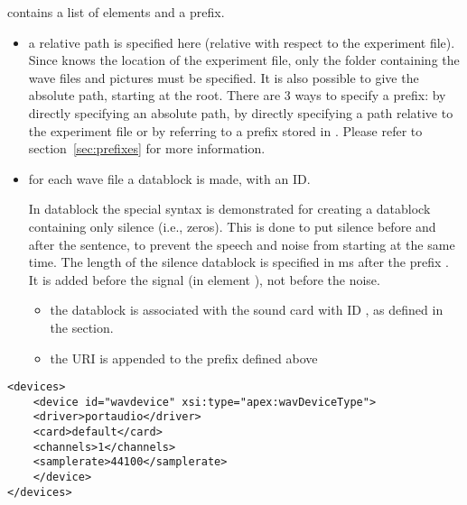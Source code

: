  contains a list of 
elements and a prefix.
\begin{itemize}
\item {} a relative path is specified here
(relative with respect to the experiment file). Since \apex knows
the location of the experiment file, only the folder containing
the wave files and pictures must be specified. It is also possible
to give the absolute path, starting at the root. There are 3 ways
to specify a prefix: by directly specifying an absolute path, by
directly specifying a path relative to the experiment file or by
referring to a prefix stored in . Please
refer to section~\ref{sec:prefixes} for more information. 

\item {} for each wave file a datablock is made,
with an ID.

In datablock  the special syntax is
demonstrated for creating a datablock containing only silence
(i.e., zeros). This is done to put silence before and after the
sentence, to prevent the speech and noise from
starting at the same time. The length of the silence datablock is
specified in ms after the prefix . It is added before the signal (in element ), not
before the noise.

\begin{itemize}
\item the datablock is associated with the sound card with ID
, as defined in the  section.

\item {} the URI is appended to the prefix defined
above

\end{itemize}
\end{itemize}






\begin{lstlisting}
<devices>
    <device id="wavdevice" xsi:type="apex:wavDeviceType">
    <driver>portaudio</driver>
    <card>default</card>
    <channels>1</channels>
    <samplerate>44100</samplerate>
    </device>
</devices>
\end{lstlisting}

